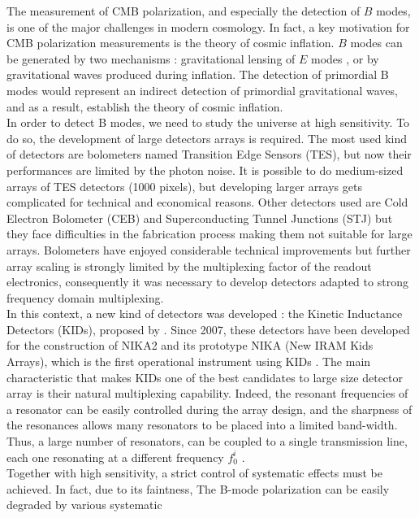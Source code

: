 \documentclass[twocolumn, traditabstract]{aa}
\begin{document}
The measurement of CMB polarization, and especially the detection of $B$ modes, is
one of the major challenges in modern cosmology. In fact, a key motivation for
CMB polarization measurements is the theory of cosmic inflation. $B$ modes can be
generated by two mechanisms : gravitational lensing of $E$ modes
\citep{2013PhRvL.111n1301H}, or by gravitational waves produced during
inflation. The detection of primordial B modes would represent an indirect
detection of primordial gravitational waves, and as a result, establish the
theory of cosmic inflation.\\ In order to detect B modes, we need to study the
universe at high sensitivity. To do so, the development of
large detectors arrays is required.  The most used kind of detectors are
bolometers named Transition Edge Sensors (TES), but now their performances are
limited by the photon noise. It is possible to do medium-sized arrays of TES
detectors (1000 pixels), but developing larger arrays gets complicated for
technical and economical reasons. Other detectors used are Cold Electron
Bolometer (CEB) \citep{2007stt..conf...93K} and Superconducting Tunnel Junctions
(STJ) but they face difficulties in the fabrication process making them not
suitable for large arrays. Bolometers have enjoyed considerable technical
improvements but further array scaling is strongly limited by the multiplexing
factor of the readout electronics, consequently it was necessary to develop
detectors adapted to strong frequency domain multiplexing.\\ In this context, a
new kind of detectors was developed : the Kinetic Inductance Detectors (KIDs),
proposed by \citet{2003Natur.425..817D}. Since 2007, these detectors have been
developed for the construction of NIKA2 and its prototype NIKA (New IRAM Kids
Arrays), which is the first operational instrument using KIDs
\citep{2010A&A...521A..29M,2016JLTP..184..816C}. The main characteristic that
makes KIDs one of the best candidates to large size detector array is their
natural multiplexing capability. Indeed, the resonant frequencies of a resonator
can be easily controlled during the array design, and the sharpness of the
resonances allows many resonators to be placed into a limited band-width. Thus,
a large number of resonators, can be coupled to a single transmission line, each
one resonating at a different frequency $f_{0}^{i}$ \citep{2010A&A...521A..29M,
  Calvo2008}.\\ Together with high sensitivity, a strict control of systematic effects must be achieved. In fact, due to its faintness, The B-mode polarization can be easily degraded by various systematic
\end{document}
